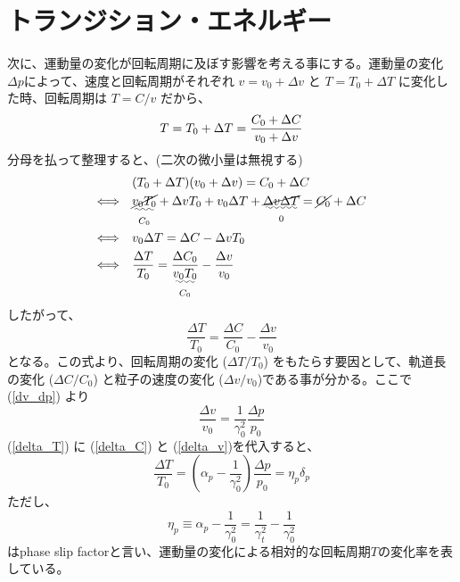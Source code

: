 \documentclass[10pt,a4paper]{ltjsarticle}
\begin{document}
\section{トランジション・エネルギー}
次に、運動量の変化が回転周期に及ぼす影響を考える事にする。運動量の変化$\Delta p$によって、速度と回転周期がそれぞれ $v=v_0+\Delta v$ と $T=T_0+\Delta T$ に変化した時、回転周期は $T=C/v$ だから、
%
\begin{equation}
  T = T_0 + \Delta T = \frac{C_0 + \Delta C}{v_0 + \Delta v} \notag
\end{equation}
%
分母を払って整理すると、(二次の微小量は無視する)
%
\begin{align}
  & (T_0 + \Delta T)(v_0 + \Delta v) = C_0 + \Delta C \notag \\
  \Longleftrightarrow\quad & \underset{C_0}{\uwave{\cancel{v_0 T_0}}} + \Delta v T_0 + v_0 \Delta T +
  \underset{0}{\uwave{\cancel{\Delta v \Delta T}}}
  = \cancel{C_0} + \Delta C \notag \\
  \Longleftrightarrow\quad & v_0 \Delta T = \Delta C- \Delta v T_0 \notag \\
  \Longleftrightarrow\quad & \frac{\Delta T}{T_0} = \frac{\Delta C_0}{\underset{C_0}{\uwave{v_0 T_0}}} - \frac{\Delta v}{v_0} \notag
\end{align}
%
したがって、
%
\begin{equation}
  \frac{\Delta T}{T_0} = \frac{\Delta C}{C_0} - \frac{\Delta v}{v_0}
  \label{delta_T}
\end{equation}
%
となる。この式より、回転周期の変化 ($\Delta T/T_0$) をもたらす要因として、軌道長の変化 ($\Delta C/C_0$) と粒子の速度の変化 ($\Delta v/v_0$)である事が分かる。ここで(\ref{dv_dp}) より
%
\begin{equation}
  \frac{\Delta v}{v_0}=\frac{1}{\gamma_0^2}\frac{\Delta p}{p_0}
  \label{delta_v}
\end{equation}
%
(\ref{delta_T}) に (\ref{delta_C}) と (\ref{delta_v})を代入すると、
%
\begin{equation}
  \frac{\Delta T}{T_0} = \left(\alpha_p - \frac{1}{\gamma_0^2}\right)\frac{\Delta p}{p_0} = \eta_p \delta_p
  \label{deltat_eta_deltap}
\end{equation}
%
ただし、
%
\begin{equation}
  \eta_p \equiv \alpha_p - \frac{1}{\gamma_0^2} = \frac{1}{\gamma_t^2} - \frac{1}{\gamma_0^2}
  \label{alppha_slip}
\end{equation}
%
はphase slip factorと言い、運動量の変化による相対的な回転周期$T$の変化率を表している。
%
\end{document}
